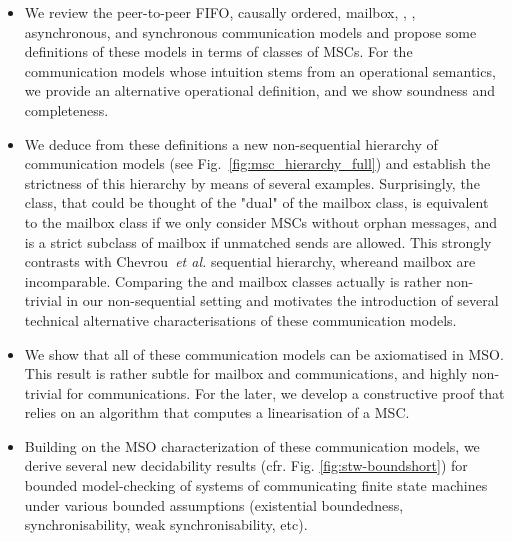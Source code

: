 \begin{itemize}
	\item We review the peer-to-peer FIFO, causally ordered, mailbox, \onen, \nn, asynchronous, and synchronous communication models
	and propose some definitions of these models in terms of classes of MSCs. For the communication models whose intuition stems from
	an operational semantics, we provide an alternative operational definition, and we show soundness and completeness.

	\item We deduce from these definitions a new non-sequential hierarchy of communication models (see Fig.~\ref{fig:msc_hierarchy_full})
	and establish the strictness of this hierarchy by means of several examples.
	Surprisingly, the \onen class, that could be thought of the "dual" of the mailbox class, is equivalent to the mailbox class if
	we only consider MSCs without orphan messages, and is a strict subclass of mailbox if unmatched sends are allowed. This strongly
	contrasts with Chevrou~\emph{et al.} sequential hierarchy, where\onen and mailbox are incomparable. Comparing
	the \onen and mailbox classes actually is rather non-trivial in our non-sequential setting and motivates the introduction
	of several technical alternative characterisations of these communication models.

	\item We show that all of these communication models can be axiomatised in MSO. This result is rather subtle for mailbox and \onen communications, and highly non-trivial for \nn communications. For the later, we develop a constructive proof that relies on an
	algorithm that computes a \nn linearisation of a \nn MSC.

	\item Building on the MSO characterization of these communication models, we derive several new decidability results (cfr. Fig. \ref{fig:stw-boundshort}) for bounded
	model-checking of systems of communicating finite state machines under various bounded assumptions (existential boundedness, synchronisability, weak synchronisability, etc).
\end{itemize}



